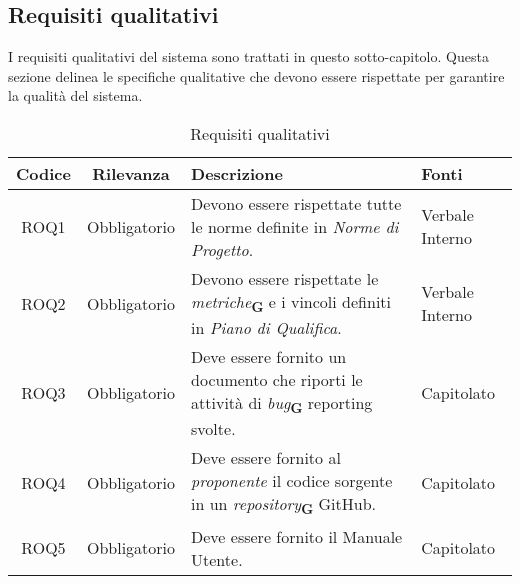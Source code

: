 \subsection{Requisiti qualitativi}
\label{sec:Requisiti_qualitativi}
I requisiti qualitativi del sistema sono trattati in questo sotto-capitolo. Questa sezione
delinea le specifiche qualitative che devono essere rispettate per garantire la qualità del
sistema.
\begin{table}[h!]
    \centering
    \renewcommand{\arraystretch}{1.6} %
    \begin{tabularx}{\textwidth}{|>{\centering\arraybackslash}c|>{\centering\arraybackslash}c|>{\centering\arraybackslash}X|>{\centering\arraybackslash}p{3cm}|} \hline
    \rowcolor[HTML]{FFD700} 
    \textbf{Codice} & \textbf{Rilevanza} & \textbf{Descrizione} & \textbf{Fonti} \\ \hline
    ROQ1 & Obbligatorio & Devono essere rispettate tutte le norme definite in \emph{Norme di Progetto}. & Verbale Interno \\ \hline
    ROQ2 & Obbligatorio & Devono essere rispettate le \emph{metriche}\textsubscript{\textbf{G}} e i vincoli definiti in \emph{Piano di Qualifica}. & Verbale Interno \\ \hline
    ROQ3 & Obbligatorio & Deve essere fornito un documento che riporti le attività di \emph{bug}\textsubscript{\textbf{G}} reporting svolte. & Capitolato \\ \hline
    ROQ4 & Obbligatorio & Deve essere fornito al \emph{proponente} il codice sorgente in un \emph{repository}\textsubscript{\textbf{G}} GitHub. & Capitolato \\ \hline
    ROQ5 & Obbligatorio & Deve essere fornito il Manuale Utente. & Capitolato \\ \hline
    \end{tabularx}
    \caption{Requisiti qualitativi}
    \label{tab:Requisiti_qualitativi}
\end{table}

